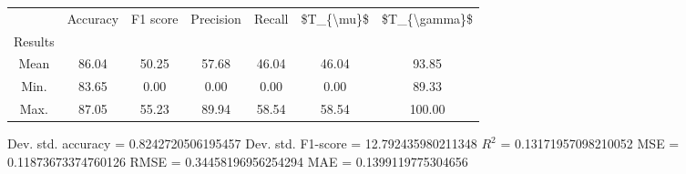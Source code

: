 \begin{tabular}{|c|c|c|c|c|c|c|}
\toprule
{} &  Accuracy &  F1 score &  Precision &  Recall &  \$T\_\{\textbackslash mu\}\$ &  \$T\_\{\textbackslash gamma\}\$ \\
Results &           &           &            &         &            &               \\
\hline
Mean    &     86.04 &     50.25 &      57.68 &   46.04 &      46.04 &         93.85 \\
Min.    &     83.65 &      0.00 &       0.00 &    0.00 &       0.00 &         89.33 \\
Max.    &     87.05 &     55.23 &      89.94 &   58.54 &      58.54 &        100.00 \\
\bottomrule
\end{tabular}

 Dev. std. accuracy = 0.8242720506195457
 Dev. std. F1-score = 12.792435980211348
 $R^2$ = 0.13171957098210052
 MSE = 0.11873673374760126
 RMSE = 0.34458196956254294
 MAE = 0.1399119775304656